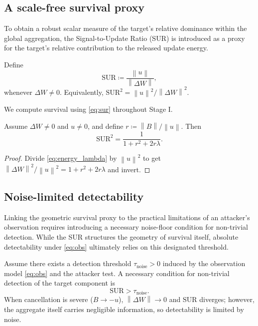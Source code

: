 \documentclass[bdcc,article,submit,pdftex]{Definitions/mdpi}
\newcommand{\norm}[1]{\left\lVert #1 \right\rVert}
\newcommand{\utarget}{u}
\begin{document}
\subsection{A scale-free survival proxy}

To obtain a robust scalar measure of the target's relative dominance within the global aggregation, the Signal-to-Update Ratio (SUR) is introduced as a proxy for the target's relative contribution to the released update energy.

\begin{Definition}
\label{def:sur}
Define
\begin{equation}
\label{eq:sur}
\mathrm{SUR} \coloneqq \frac{\norm{\utarget}}{\norm{\Delta W}},
\end{equation}
whenever $\Delta W\neq 0$. Equivalently, $\mathrm{SUR}^2=\norm{\utarget}^2/\norm{\Delta W}^2$.
\end{Definition}
\noindent We compute survival using \eqref{eq:sur} throughout Stage I.

\begin{Lemma}
\label{prop:sur_closed}
Assume $\Delta W\neq 0$ and $\utarget\neq 0$, and define $r\coloneqq \norm{B}/\norm{\utarget}$.
Then
\begin{equation}
\label{eq:sur_r}
\mathrm{SUR}^2 = \frac{1}{1+r^2+2r\lambda}.
\end{equation}
\end{Lemma}

\begin{proof}
Divide \eqref{eq:energy_lambda} by $\norm{\utarget}^2$ to get $\norm{\Delta W}^2/\norm{\utarget}^2 = 1+r^2+2r\lambda$ and invert.
\end{proof}

\subsection{Noise-limited detectability}

Linking the geometric survival proxy to the practical limitations of an attacker's observation requires introducing a necessary noise-floor condition for non-trivial detection. While the SUR structures the geometry of survival itself, absolute detectability under \eqref{eq:obs} ultimately relies on this designated threshold.

\begin{Assumption}
\label{cond:noise}
Assume there exists a detection threshold $\tau_{\mathrm{noise}}>0$ induced by the observation model \eqref{eq:obs} and the attacker test.
A necessary condition for non-trivial detection of the target component is
\begin{equation}
\label{eq:noise_cond}
\mathrm{SUR} > \tau_{\mathrm{noise}}.
\end{equation}
When cancellation is severe ($B \to -\utarget$), $\norm{\Delta W} \to 0$ and $\mathrm{SUR}$ diverges; however, the aggregate itself carries negligible information, so detectability is limited by noise.
\end{Assumption}
\end{document}
